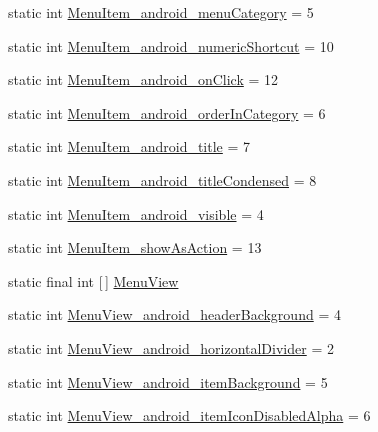 \begin{DoxyCompactItemize}
\item 
static int \hyperlink{classandroid_1_1support_1_1v7_1_1appcompat_1_1R_1_1styleable_a9c6e0b2ed82827b95fcff2fbf9f39051}{Menu\+Item\+\_\+android\+\_\+menu\+Category} = 5
\item 
static int \hyperlink{classandroid_1_1support_1_1v7_1_1appcompat_1_1R_1_1styleable_aee6f9bc59bc0547644270a50ba642e63}{Menu\+Item\+\_\+android\+\_\+numeric\+Shortcut} = 10
\item 
static int \hyperlink{classandroid_1_1support_1_1v7_1_1appcompat_1_1R_1_1styleable_aa6d58c4b1c1b588c49af10c836c5766d}{Menu\+Item\+\_\+android\+\_\+on\+Click} = 12
\item 
static int \hyperlink{classandroid_1_1support_1_1v7_1_1appcompat_1_1R_1_1styleable_a330d0bddcfe98ca0abe1e746c3d7a33e}{Menu\+Item\+\_\+android\+\_\+order\+In\+Category} = 6
\item 
static int \hyperlink{classandroid_1_1support_1_1v7_1_1appcompat_1_1R_1_1styleable_adf2e7aa6bcadb8c5cf1968595d673c5d}{Menu\+Item\+\_\+android\+\_\+title} = 7
\item 
static int \hyperlink{classandroid_1_1support_1_1v7_1_1appcompat_1_1R_1_1styleable_a8c8d837f91a27ff093a0935e00483f56}{Menu\+Item\+\_\+android\+\_\+title\+Condensed} = 8
\item 
static int \hyperlink{classandroid_1_1support_1_1v7_1_1appcompat_1_1R_1_1styleable_aebbb1f4365cda37ee838c1def4ab0774}{Menu\+Item\+\_\+android\+\_\+visible} = 4
\item 
static int \hyperlink{classandroid_1_1support_1_1v7_1_1appcompat_1_1R_1_1styleable_a1de0f110dc9609ff73b8af75f8d563ed}{Menu\+Item\+\_\+show\+As\+Action} = 13
\item 
static final int \mbox{[}$\,$\mbox{]} \hyperlink{classandroid_1_1support_1_1v7_1_1appcompat_1_1R_1_1styleable_ab45f4f3fe3b636a3730a9fb26bfa1050}{Menu\+View}
\item 
static int \hyperlink{classandroid_1_1support_1_1v7_1_1appcompat_1_1R_1_1styleable_a9c0eeec4e3e6054bad955d013d985d26}{Menu\+View\+\_\+android\+\_\+header\+Background} = 4
\item 
static int \hyperlink{classandroid_1_1support_1_1v7_1_1appcompat_1_1R_1_1styleable_a8fc0d8471f20ad27ea31f2f6e91a7c4e}{Menu\+View\+\_\+android\+\_\+horizontal\+Divider} = 2
\item 
static int \hyperlink{classandroid_1_1support_1_1v7_1_1appcompat_1_1R_1_1styleable_ab077ea4deb3c1bc7536b4f0339e92b0a}{Menu\+View\+\_\+android\+\_\+item\+Background} = 5
\item 
static int \hyperlink{classandroid_1_1support_1_1v7_1_1appcompat_1_1R_1_1styleable_afb79e93a74e10b7276373c5811009513}{Menu\+View\+\_\+android\+\_\+item\+Icon\+Disabled\+Alpha} = 6

\end{DoxyCompactItemize}
